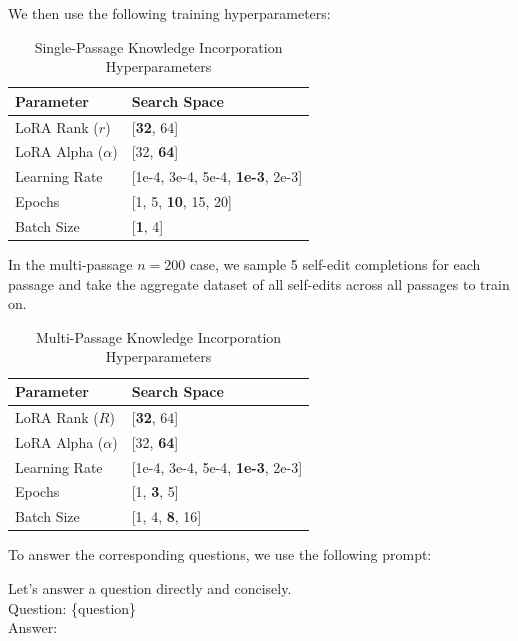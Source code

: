 \documentclass{article}
\begin{document}
We then use the following training hyperparameters:

\begin{table}[ht]
    \centering
    \caption{Single-Passage Knowledge Incorporation Hyperparameters}
    \label{tab:single_passage_knowledge}
    \small
    \begin{tabularx}{0.5\linewidth}{l X}
        \toprule
        \textbf{Parameter} & \textbf{Search Space} \\
        \midrule
        LoRA Rank (\(r\)) & [\textbf{32}, 64] \\
        LoRA Alpha (\(\alpha\)) & [32, \textbf{64}] \\
        Learning Rate & [1e-4, 3e-4, 5e-4, \textbf{1e-3}, 2e-3] \\
        Epochs & [1, 5, \textbf{10}, 15, 20] \\
        Batch Size & [\textbf{1}, 4] \\
        \bottomrule
    \end{tabularx}
\end{table}

In the multi-passage $n=200$ case, we sample 5 self-edit completions for each passage and take the aggregate dataset of all self-edits across all passages to train on.

\begin{table}[ht]
    \centering
    \caption{Multi-Passage Knowledge Incorporation Hyperparameters}
    \label{tab:multi_passage_knowledge}
    \small
    \begin{tabularx}{0.5\linewidth}{l X}
        \toprule
        \textbf{Parameter} & \textbf{Search Space} \\
        \midrule
        LoRA Rank (\(R\)) & [\textbf{32}, 64] \\
        LoRA Alpha (\(\alpha\)) & [32, \textbf{64}] \\
        Learning Rate & [1e-4, 3e-4, 5e-4, \textbf{1e-3}, 2e-3] \\
        Epochs & [1, \textbf{3}, 5] \\
        Batch Size & [1, 4, \textbf{8}, 16] \\
        \bottomrule
    \end{tabularx}
\end{table}

To answer the corresponding questions, we use the following prompt:

\begin{tcolorbox}
Let's answer a question directly and concisely. \\
Question: \{question\} \\
Answer:
\end{tcolorbox}
\end{document}
